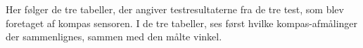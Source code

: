 \label{appendix:kompas_test}
Her følger de tre tabeller, der angiver testresultaterne fra de tre test, som blev foretaget af kompas sensoren.
I de tre tabeller, ses først hvilke kompas-afmålinger der sammenlignes, sammen med den målte vinkel.




